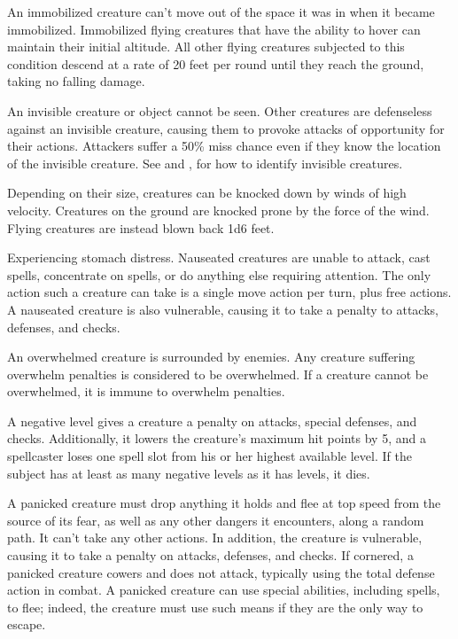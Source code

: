  An immobilized creature can't move out of the space it was in when it became immobilized. Immobilized flying creatures that have the ability to hover can maintain their initial altitude. All other flying creatures subjected to this condition descend at a rate of 20 feet per round until they reach the ground, taking no falling damage.

 An invisible creature or object cannot be seen. Other creatures are defenseless against an invisible creature, causing them to provoke attacks of opportunity for their actions. Attackers suffer a 50\% miss chance even if they know the location of the invisible creature. See  and , for how to identify invisible creatures.

 Depending on their size, creatures can be knocked down by winds of high velocity. Creatures on the ground are knocked prone by the force of the wind. Flying creatures are instead blown back 1d6  feet.

 Experiencing stomach distress. Nauseated creatures are unable to attack, cast spells, concentrate on spells, or do anything else requiring attention. The only action such a creature can take is a single move action per turn, plus free actions. A nauseated creature is also vulnerable, causing it to take a  penalty to attacks, defenses, and checks.

 An overwhelmed creature is surrounded by enemies. Any creature suffering overwhelm penalties is considered to be overwhelmed. If a creature cannot be overwhelmed, it is immune to overwhelm penalties.

 A negative level gives a creature a  penalty on attacks, special defenses, and checks. Additionally, it lowers the creature's maximum hit points by 5, and a spellcaster loses one spell slot from his or her highest available level. If the subject has at least as many negative levels as it has levels, it dies.

 A panicked creature must drop anything it holds and flee at top speed from the source of its fear, as well as any other dangers it encounters, along a random path. It can't take any other actions. In addition, the creature is vulnerable, causing it to take a  penalty on attacks, defenses, and checks. If cornered, a panicked creature cowers and does not attack, typically using the total defense action in combat. A panicked creature can use special abilities, including spells, to flee; indeed, the creature must use such means if they are the only way to escape.

